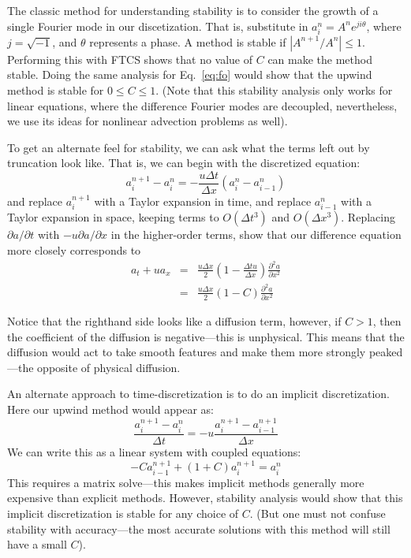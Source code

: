 The classic method for understanding stability is to consider the growth 
of a single Fourier mode in our discetization.  That is, substitute in
$a_i^n = A^n e^{ji\theta}$, where $j = \sqrt{-1}$, and $\theta$ represents a
phase.  A method is stable if $|A^{n+1}/A^n| \le 1$.  Performing this
with FTCS shows that no value of $C$ can make the method stable.
Doing the same analysis for Eq.~\ref{eq:fo} would show that the upwind
method is stable for $0\le C \le 1$. 
(Note that this stability analysis only works for linear equations, where
the difference Fourier modes are decoupled, nevertheless, we use its
ideas for nonlinear advection problems as well).

\begin{exercise}
{To get an alternate feel for stability, we can ask
  what the terms left out by truncation look like.  That is, we can
  begin with the discretized equation:
\begin{equation}
  a_i^{n+1} - a_i^n = -\frac{u \Delta t}{\Delta x} ( a_i^n - a_{i-1}^n )
\end{equation}
and replace $a_i^{n+1}$ with a Taylor expansion in time, and replace
$a_{i-1}^n$ with a Taylor expansion in space, keeping terms to
$O(\Delta t^3)$ and $O(\Delta x^3)$.  Replacing $\partial a/\partial t$
with $-u \partial a/ \partial x$ in the higher-order terms, show 
that our difference equation more closely corresponds to 
\begin{eqnarray}
a_t + u a_x &=& \frac{u \Delta x}{2} \left ( 1 - \frac{\Delta t u}{\Delta x} \right ) \frac{\partial^2 a}{\partial x^2} \\
            &=& \frac{u \Delta x}{2} (1 - C) \frac{\partial^2 a}{\partial x^2}
\end{eqnarray}

\noindent Notice that the righthand side looks like a diffusion term, however,
if $C > 1$, then the coefficient of the diffusion is negative---this is
unphysical.  This means that the diffusion would act to take smooth
features and make them more strongly peaked---the opposite of physical
diffusion.

}
\end{exercise}

An alternate approach to time-discretization is to do an implicit
discretization.  Here our upwind method would appear as:
\begin{equation}
\frac{a^{n+1}_i - a^n_i}{\Delta t} = -u \frac{a^{n+1}_i - a^{n+1}_{i-1}}{\Delta x}
\end{equation}
We can write this as a linear system with coupled equations:
\begin{equation}
-C a^{n+1}_{i-1} + (1 + C) a^{n+1}_i = a_i^n
\end{equation}
This requires a matrix solve---this makes implicit methods generally more
expensive than explicit methods.  However, stability analysis would show
that this implicit discretization is stable for any choice of $C$. (But
one must not confuse stability with accuracy---the most accurate solutions
with this method will still have a small $C$).

